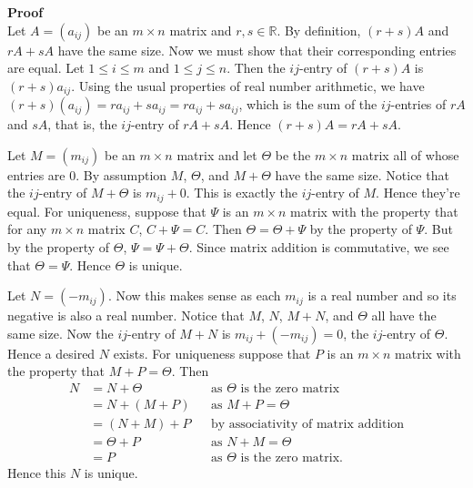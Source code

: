\documentclass[12pt]{article}
\def\R{\mathbb{R}} \def\Q{\mathbb{Q}} \def\N{\mathbb{N}} \def\Z{\mathbb{Z}} \def\P{\mathbb{P}}
\begin{document}
\noindent
{\bf Proof} \\
Let $A = (a_{ij})$ be an $m \times n$ matrix and $r, s \in \R$. By definition, $(r + s)A$ and $rA + sA$ have the same size. Now we must show that their corresponding entries are equal.  Let $1 \leq i \leq m$ and $1 \leq j \leq n$. Then the $ij$-entry of $(r + s)A$ is $(r + s)a_{ij}$. Using the usual properties of real number arithmetic, we have $(r + s)(a_{ij}) = ra_{ij} + sa_{ij} = ra_{ij} + sa_{ij}$, which is the sum of the $ij$-entries of $rA$ and $sA$, that is, the $ij$-entry of $rA + sA$. Hence $(r + s)A = rA + sA$. 

Let $M = (m_{ij})$ be an $m \times n$ matrix and let $\Theta$ be the $m \times n$ matrix all of whose entries are $0$. By assumption $M$, $\Theta$, and $M + \Theta$
have the same size. Notice that the $ij$-entry of $M + \Theta$ is $m_{ij} + 0$. This is exactly the $ij$-entry of $M$. Hence they're equal. For uniqueness, suppose that $\Psi$ is an $m \times n$ matrix with the property that for any $m \times n$ matrix $C$, $C + \Psi = C$. Then $\Theta = \Theta + \Psi$ by the property of $\Psi$. But by the property of $\Theta$, $\Psi = \Psi + \Theta$. Since matrix addition is commutative, we see that $\Theta = \Psi$. Hence $\Theta$ is unique.

Let $N = (-m_{ij})$. Now this makes sense as each $m_{ij}$ is a real number and so its negative is also a real number. Notice that $M$, $N$, $M + N$, and $\Theta$ all have the same size. Now the $ij$-entry of $M + N$ is $m_{ij} + (-m_{ij}) = 0$, the $ij$-entry of $\Theta$. Hence a desired $N$ exists. For uniqueness suppose that $P$ is an $m \times n$ matrix with the property that $M + P = \Theta$. Then 
\begin{align*}
N &= N + \Theta && \text{as $\Theta$ is the zero matrix} \\
  &= N + (M + P) && \text{as $M + P = \Theta$} \\
  &= (N + M) + P && \text{by associativity of matrix addition} \\
  &= \Theta + P && \text{as $N + M = \Theta$} \\
  &= P && \text{as $\Theta$ is the zero matrix}.
\end{align*}
Hence this $N$ is unique.
\end{document}

